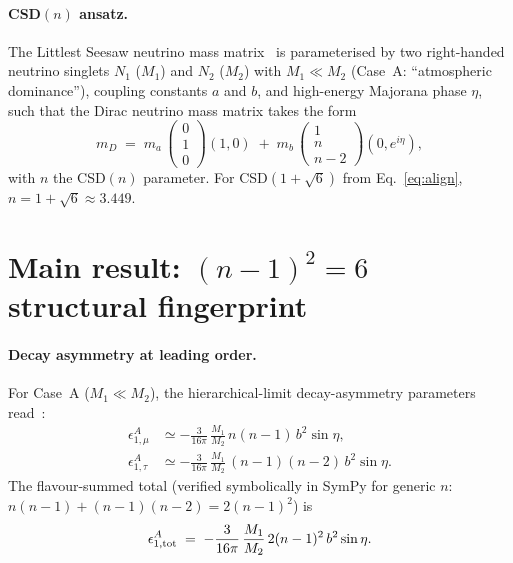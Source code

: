 \documentclass[aps,prl,twocolumn,showpacs,superscriptaddress]{revtex4-2}
\begin{document}
\paragraph{CSD$(n)$ ansatz.}
The Littlest Seesaw neutrino mass matrix~\cite{KMSR18} is
parameterised by two right-handed neutrino singlets $N_1$ ($M_1$)
and $N_2$ ($M_2$) with $M_1 \ll M_2$ (Case~A: ``atmospheric
dominance''), coupling constants $a$ and $b$, and high-energy
Majorana phase $\eta$, such that the Dirac neutrino mass matrix
takes the form
\begin{equation}
  m_D \;=\; m_a\,\begin{pmatrix}0\\1\\0\end{pmatrix}\!
           (1,0) \;+\;
           m_b\,\begin{pmatrix}1\\n\\n-2\end{pmatrix}\!
           (0, e^{i\eta}),
  \label{eq:mD}
\end{equation}
with $n$ the CSD$(n)$ parameter.  For CSD$(1+\sqrt{6})$ from
Eq.~\eqref{eq:align}, $n = 1+\sqrt{6} \approx 3.449$.

\section{Main result: $(n-1)^2 = 6$ structural fingerprint}
\label{sec:main}

\paragraph{Decay asymmetry at leading order.}
For Case~A ($M_1 \ll M_2$), the hierarchical-limit
decay-asymmetry parameters read~\cite{KMSR18}:
\begin{align}
  \epsilon^A_{1,\mu}  &\simeq
    -\frac{3}{16\pi}\,\frac{M_1}{M_2}\,n(n-1)\,b^2 \sin\eta,
  \label{eq:emu}\\
  \epsilon^A_{1,\tau} &\simeq
    -\frac{3}{16\pi}\,\frac{M_1}{M_2}\,(n-1)(n-2)\,b^2 \sin\eta.
  \label{eq:etau}
\end{align}
The flavour-summed total (verified symbolically in SymPy for
generic $n$: $n(n-1)+(n-1)(n-2) = 2(n-1)^2$) is
\begin{equation}
  \epsilon^A_{1,\rm tot}
  \;=\; -\frac{3}{16\pi}\,\frac{M_1}{M_2}\,2(n-1)^2\,b^2\sin\eta.
  \label{eq:etot}
\end{equation}
\end{document}
